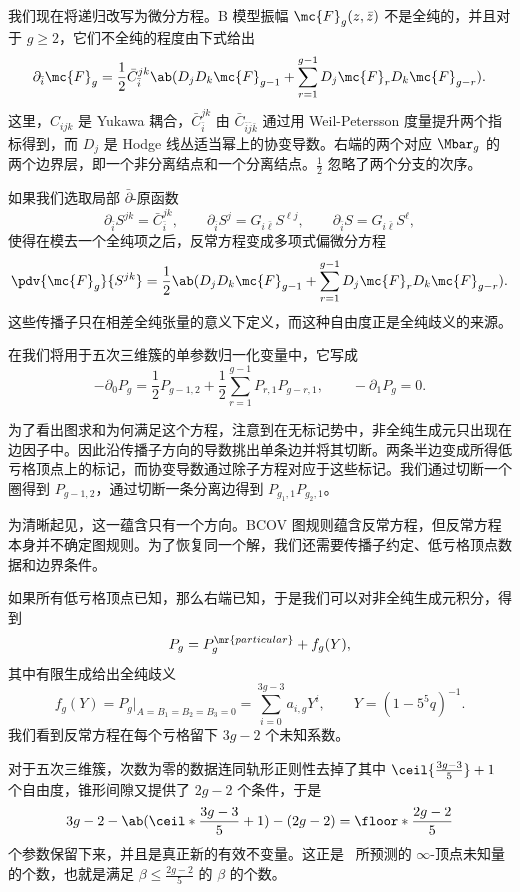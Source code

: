 我们现在将递归改写为微分方程。B 模型振幅 \(\mc{F}_g(z,\bar{z})\) 不是全纯的，并且对于 \(g \geq 2\)，它们不全纯的程度由下式给出
\[ \partial_{\bar{i}} \mc{F}_g = \frac{1}{2}\bar{C}_{\bar{i}}^{jk}\ab( D_j D_k \mc{F}_{g-1} + \sum_{r=1}^{g-1} D_j \mc{F}_r D_k \mc{F}_{g-r} ). \]
这里，\(C_{ijk}\) 是 Yukawa 耦合，\(\bar{C}_{\bar{i}}^{jk}\) 由 \(\bar{C}_{\bar{i}\bar{j}\bar{k}}\) 通过用 Weil-Petersson 度量提升两个指标得到，而 \(D_j\) 是 Hodge 线丛适当幂上的协变导数。右端的两个对应 \(\Mbar_g\) 的两个边界层，即一个非分离结点和一个分离结点。\(\frac{1}{2}\) 忽略了两个分支的次序。

如果我们选取局部 \(\bar{\partial}\)-原函数
\[ \partial_{\bar{i}}S^{jk} = \bar{C}_{\bar{i}}^{jk}, \qquad \partial_{\bar{i}}S^j = G_{i\bar{\ell}}S^{\ell j}, \qquad \partial_{\bar{i}}S = G_{i\bar{\ell}}S^{\ell}, \]
使得在模去一个全纯项之后，反常方程变成多项式偏微分方程
\[ \pdv{\mc{F}_g}{S^{jk}} = \frac{1}{2}\ab( D_jD_k \mc{F}_{g-1} + \sum_{r=1}^{g-1} D_j \mc{F}_r D_k \mc{F}_{g-r} ). \]
这些传播子只在相差全纯张量的意义下定义，而这种自由度正是全纯歧义的来源。

\begin{rmk}
    在我们将用于五次三维簇的单参数归一化变量中，它写成
    \[ -\partial_0 P_g = \frac{1}{2}P_{g-1,2} + \frac{1}{2}\sum_{r=1}^{g-1}P_{r,1}P_{g-r,1}, \qquad -\partial_1 P_g = 0. \]
\end{rmk}

为了看出图求和为何满足这个方程，注意到在无标记势中，非全纯生成元只出现在边因子中。因此沿传播子方向的导数挑出单条边并将其切断。两条半边变成所得低亏格顶点上的标记，而协变导数通过除子方程对应于这些标记。我们通过切断一个圈得到 \(P_{g-1,2}\)，通过切断一条分离边得到 \(P_{g_1,1}P_{g_2,1}\)。

\begin{rmk}
    为清晰起见，这一蕴含只有一个方向。BCOV 图规则蕴含反常方程，但反常方程本身并不确定图规则。为了恢复同一个解，我们还需要传播子约定、低亏格顶点数据和边界条件。
\end{rmk}

如果所有低亏格顶点已知，那么右端已知，于是我们可以对非全纯生成元积分，得到
\[ P_g = P_g^{\mr{particular}} + f_g(Y), \]
其中有限生成给出全纯歧义
\[ f_g(Y) = P_g|_{A = B_1 = B_2 = B_3 = 0} = \sum_{i=0}^{3g-3}a_{i,g}Y^i, \qquad Y = (1-5^5q)^{-1}. \]
我们看到反常方程在每个亏格留下 \(3g-2\) 个未知系数。

\begin{rmk}
    对于五次三维簇，次数为零的数据连同轨形正则性去掉了其中 \(\ceil{\frac{3g-3}{5}}+1\) 个自由度，锥形间隙又提供了 \(2g-2\) 个条件，于是
    \[ 3g-2 - \ab(\ceil*{\frac{3g-3}{5}}+1) - (2g-2) = \floor*{\frac{2g-2}{5}} \]
    个参数保留下来，并且是真正新的有效不变量。这正是~ 所预测的 \(\infty\)-顶点未知量的个数，也就是满足 \(\beta \leq \frac{2g-2}{5}\) 的 \(\beta\) 的个数。
\end{rmk}

